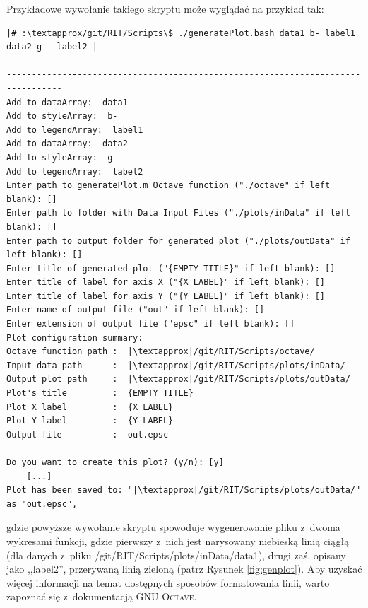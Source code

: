 
Przykładowe wywołanie takiego skryptu może wyglądać na przykład tak:

\begin{verbatim}
|# :\textapprox/git/RIT/Scripts\$ ./generatePlot.bash data1 b- label1 data2 g-- label2 |

---------------------------------------------------------------------------------
Add to dataArray:  data1
Add to styleArray:  b-
Add to legendArray:  label1
Add to dataArray:  data2
Add to styleArray:  g--
Add to legendArray:  label2
Enter path to generatePlot.m Octave function ("./octave" if left blank): []
Enter path to folder with Data Input Files ("./plots/inData" if left blank): [] 
Enter path to output folder for generated plot ("./plots/outData" if left blank): []
Enter title of generated plot ("{EMPTY TITLE}" if left blank): []
Enter title of label for axis X ("{X LABEL}" if left blank): []
Enter title of label for axis Y ("{Y LABEL}" if left blank): []
Enter name of output file ("out" if left blank): []
Enter extension of output file ("epsc" if left blank): []
Plot configuration summary: 
Octave function path :	|\textapprox|/git/RIT/Scripts/octave/
Input data path      :	|\textapprox|/git/RIT/Scripts/plots/inData/
Output plot path     :	|\textapprox|/git/RIT/Scripts/plots/outData/
Plot's title         :	{EMPTY TITLE}
Plot X label         :	{X LABEL}
Plot Y label         :	{Y LABEL}
Output file          :	out.epsc

Do you want to create this plot? (y/n): [y]
	[...]
Plot has been saved to: "|\textapprox|/git/RIT/Scripts/plots/outData/" as "out.epsc",
\end{verbatim}
gdzie powyższe wywołanie skryptu spowoduje wygenerowanie pliku z~dwoma wykresami funkcji, gdzie pierwszy z~nich jest narysowany niebieską linią ciągłą (dla danych z~pliku \textsf{\textapprox/git/RIT/Scripts/plots/inData/data1}), drugi zaś, opisany jako ,,label2'',  przerywaną linią zieloną (patrz Rysunek \ref{fig:genplot}). Aby uzyskać więcej informacji na temat dostępnych sposobów formatowania linii, warto zapoznać się z~dokumentacją \textsc{GNU Octave}.

